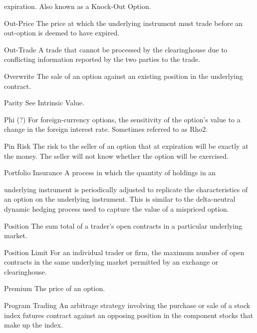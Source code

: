 expiration. Also known as a Knock-Out Option.\par
Out-Price The price at which the underlying instrument must trade before an out-option is deemed to have expired.\par
Out-Trade A trade that cannot be processed by the clearinghouse due to conflicting information reported by the two parties to the trade.\par
Overwrite The sale of an option against an existing position in the underlying contract.\par
Parity See Intrinsic Value.\par
Phi (?) For foreign-currency options, the sensitivity of the option's value to a change in the foreign interest rate. Sometimes referred to as Rho2.\par
Pin Risk The risk to the seller of an option that at expiration will be exactly at the money. The seller will not know whether the option will be exercised.\par
Portfolio Insurance A process in which the quantity of holdings in an\par
underlying instrument is periodically adjusted to replicate the characteristics of an option on the underlying instrument. This is similar to the delta-neutral dynamic hedging process used to capture the value of a mispriced option.\par
Position The sum total of a trader's open contracts in a particular underlying market.\par
Position Limit For an individual trader or firm, the maximum number of open contracts in the same underlying market permitted by an exchange or clearinghouse.\par
Premium The price of an option.\par
Program Trading An arbitrage strategy involving the purchase or sale of a stock index futures contract against an opposing position in the component stocks that make up the index.\par

